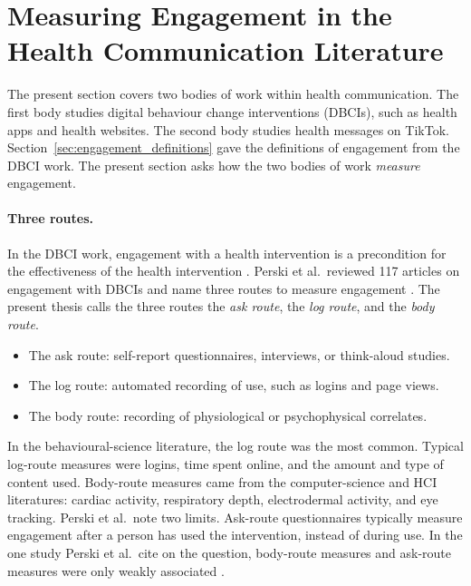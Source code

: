 \documentclass[12pt,a4paper]{report}
\makeatletter
\let\@runninghead\@empty
\newcommand{\runninghead}[1]{\gdef\@runninghead{#1}}
\makeatother
\begin{document}
\runninghead{Measuring Engagement in Health Communication}
\section{Measuring Engagement in the Health Communication Literature}
\label{sec:health_communication_literature}

The present section covers two bodies of work within health communication. The first body studies digital behaviour change interventions (DBCIs), such as health apps and health websites. The second body studies health messages on TikTok. Section~\ref{sec:engagement_definitions} gave the definitions of engagement from the DBCI work. The present section asks how the two bodies of work \emph{measure} engagement.

\paragraph{Three routes.} In the DBCI work, engagement with a health intervention is a precondition for the effectiveness of the health intervention \cite{yardley_understanding_2016}. Perski et al.\ reviewed 117 articles on engagement with DBCIs and name three routes to measure engagement \cite{perski_conceptualising_2017}. The present thesis calls the three routes the \emph{ask route}, the \emph{log route}, and the \emph{body route}.
\begin{itemize}
    \item The ask route: self-report questionnaires, interviews, or think-aloud studies.
    \item The log route: automated recording of use, such as logins and page views.
    \item The body route: recording of physiological or psychophysical correlates.
\end{itemize}
In the behavioural-science literature, the log route was the most common. Typical log-route measures were logins, time spent online, and the amount and type of content used. Body-route measures came from the computer-science and HCI literatures: cardiac activity, respiratory depth, electrodermal activity, and eye tracking. Perski et al.\ note two limits. Ask-route questionnaires typically measure engagement after a person has used the intervention, instead of during use. In the one study Perski et al.\ cite on the question, body-route measures and ask-route measures were only weakly associated \cite{perski_conceptualising_2017}.
\end{document}
